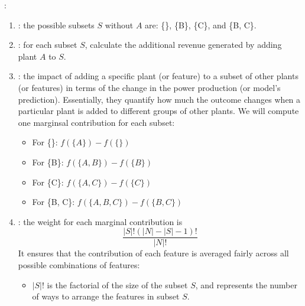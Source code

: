 \documentclass[letterpaper,10pt,english]{jupyterBook}
\begin{document}
\sphinxAtStartPar
{}:
\begin{enumerate}
%
\item {} 
\sphinxAtStartPar
{}: the possible subsets \(S\) without \(A\) are: \{\}, \{B\}, \{C\}, and \{B, C\}.

\item {} 
\sphinxAtStartPar
{}: for each subset \(S\), calculate the additional revenue generated by adding plant \(A\) to \(S\).

\item {} 
\sphinxAtStartPar
{}: the impact of adding a specific plant (or feature) to a subset of other plants (or features) in terms of the change in the power production (or model’s prediction). Essentially, they quantify how much the outcome changes when a particular plant is added to different groups of other plants. We will compute one marginsal contribution for each subset:
\begin{itemize}
\item {} 
\sphinxAtStartPar
For \{\}: \(f(\{A\}) - f(\{\})\)

\item {} 
\sphinxAtStartPar
For \{B\}: \(f(\{A, B\}) - f(\{B\})\)

\item {} 
\sphinxAtStartPar
For \{C\}: \(f(\{A, C\}) - f(\{C\})\)

\item {} 
\sphinxAtStartPar
For \{B, C\}: \(f(\{A, B, C\}) - f(\{B, C\})\)

\end{itemize}

\item {} 
\sphinxAtStartPar
{}: the weight for each marginal contribution is
\label{equation:notebooks/shapley:f51c4a7b-f721-45b8-866f-a39fe635de1f}\begin{equation}
       \frac{|S|!(|N| - |S| - 1)!}{|N|!}
   \end{equation}
\sphinxAtStartPar
It ensures that the contribution of each feature is averaged fairly across all possible combinations of features:
\begin{itemize}
\item {} 
\sphinxAtStartPar
\(|S|!\) is the factorial of the size of the subset \(S\), and represents the number of ways to arrange the features in subset \(S\).


\end{itemize}
\end{enumerate}
\end{document}
